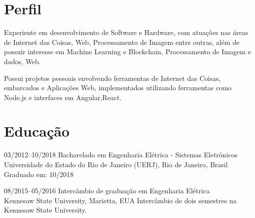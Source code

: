 \documentclass[]{friggeri-cv} %
\begin{document}
\section{Perfil}

Experiente em desenvolvimento de Software e Hardware, com atuações nas áreas de Internet das Coisas, Web, Processamento de Imagem entre outras, além de possuir interesse em Machine Learning e Blockchain, Processamento de Imagem e dados, Web.

Possui projetos pessoais envolvendo ferramentas de Internet das Coisas, embarcados e Aplicações Web, implementados utilizando ferramentas  como Node.js e interfaces em Angular,React.

\section{Educação}

\begin{entrylist}


\entry
{03/2012--10/2018}
{\hspace{.25cm} Bacharelado em Engenharia Elétrica - Sistemas Eletrônicos}
{\\Universidade do Estado do Rio de Janeiro (UERJ), Rio de Janeiro, Brasil}
{Graduado em: 10/2018 \\ \color{red}{CR = 7.85/10.0} }


\entry
{08/2015--05/2016}
{\hspace{.25cm} Intercâmbio de graduação em Engenharia Elétrica}
{\\Kennesaw State University, Marietta, EUA}
{Intercâmbio de dois semestres na Kennesaw State University.  \\
\color{red}{GPA = 3.9/4.0} }


\end{entrylist}

\end{document}
